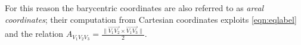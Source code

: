 For this reason the barycentric coordinates are also referred to as \emph{areal coordinates}; their computation from Cartesian coordinates exploits \eqref{eqn:eqlabel} and the relation $A_{V_1V_2V_3} = \frac{\| \overrightarrow{V_1V_2} \times \overrightarrow{V_1V_3}  \|}{2}$.










% 
% 
% 
% 
% 

